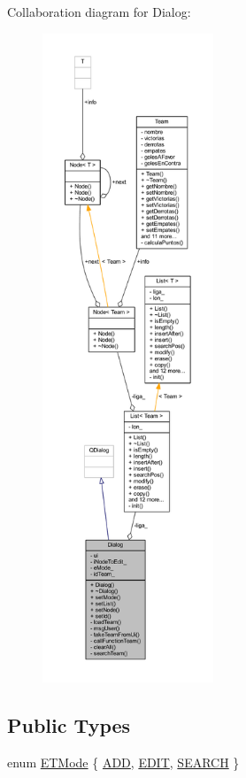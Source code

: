 Collaboration diagram for Dialog\+:
\nopagebreak
\begin{figure}[H]
\begin{center}
\leavevmode
\includegraphics[height=550pt]{d6/d66/class_dialog__coll__graph}
\end{center}
\end{figure}
\subsection*{Public Types}
\begin{DoxyCompactItemize}
\item 
enum \hyperlink{class_dialog_ae78164fb050172481b9bc05bdbbdc9b0}{E\+T\+Mode} \{ \hyperlink{class_dialog_ae78164fb050172481b9bc05bdbbdc9b0a382169df655aea6ae97508c2cbba7d3e}{A\+D\+D}, 
\hyperlink{class_dialog_ae78164fb050172481b9bc05bdbbdc9b0a89d44aa4439f5e2be5a9e99935813385}{E\+D\+I\+T}, 
\hyperlink{class_dialog_ae78164fb050172481b9bc05bdbbdc9b0a3ee13ecddf383e1872ad53f5f1947ef1}{S\+E\+A\+R\+C\+H}
 \}
\end{DoxyCompactItemize}
